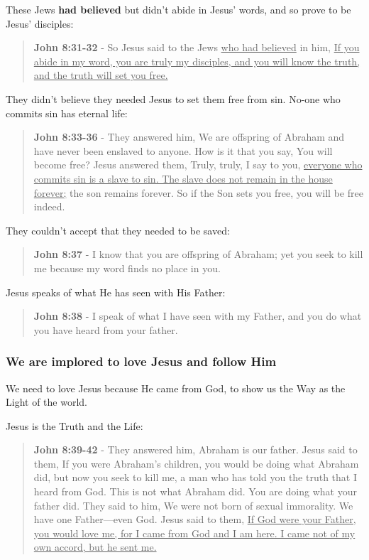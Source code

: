 \documentclass[11pt]{article}
\begin{document}
These Jews \textbf{had believed} but didn't abide in Jesus' words, and so prove to be Jesus' disciples:

\begin{quote}
\textbf{John 8:31-32} - So Jesus said to the Jews \uline{who had believed} in him, \uline{If you abide in my word, you are truly my disciples, and you will know the truth, and the truth will set you free.}
\end{quote}

They didn't believe they needed Jesus to set them free from sin. No-one who commits sin has eternal life:

\begin{quote}
\textbf{John 8:33-36} - They answered him, We are offspring of Abraham and have never been enslaved to anyone. How is it that you say, You will become free? Jesus answered them, Truly, truly, I say to you, \uline{everyone who commits sin is a slave to sin. The slave does not remain in the house forever;} the son remains forever. So if the Son sets you free, you will be free indeed.
\end{quote}

They couldn't accept that they needed to be saved:

\begin{quote}
\textbf{John 8:37} - I know that you are offspring of Abraham; yet you seek to kill me because my word finds no place in you.
\end{quote}

Jesus speaks of what He has seen with His Father:

\begin{quote}
\textbf{John 8:38} - I speak of what I have seen with my Father, and you do what you have heard from your father.
\end{quote}

\subsubsection{We are implored to love Jesus and follow Him}
\label{sec:org167ffb1}
We need to love Jesus because He came from
God, to show us the Way as the Light of the
world.

Jesus is the Truth and the Life:

\begin{quote}
\textbf{John 8:39-42} - They answered him, Abraham is our father. Jesus said to them, If you were Abraham's children, you would be doing what Abraham did, but now you seek to kill me, a man who has told you the truth that I heard from God. This is not what Abraham did. You are doing what your father did. They said to him, We were not born of sexual immorality. We have one Father—even God. Jesus said to them, \uline{If God were your Father, you would love me, for I came from God and I am here. I came not of my own accord, but he sent me.}
\end{quote}
\end{document}
